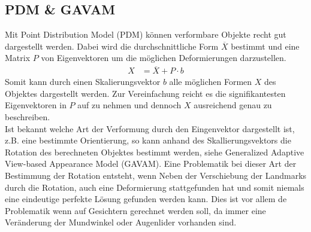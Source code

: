 \subsection{PDM \& GAVAM}
Mit Point Distribution Model (PDM) können verformbare Objekte recht gut dargestellt werden. Dabei wird die durchschnittliche Form $\overline{X}$ bestimmt und eine Matrix $P$ von Eigenvektoren um die möglichen Deformierungen darzustellen.
\begin{align*}
X &= \overline{X}+P\cdot b
\end{align*}
Somit kann durch einen Skalierungsvektor $b$ alle möglichen Formen $X$ des Objektes dargestellt werden. Zur Vereinfachung reicht es die signifikantesten Eigenvektoren in $P$ auf zu nehmen und dennoch $X$ ausreichend genau zu beschreiben.\\
Ist bekannt welche Art der Verformung durch den Eingenvektor dargestellt ist, z.B. eine bestimmte Orientierung, so kann anhand des Skallierungsvektors die Rotation des berechneten Objektes bestimmt werden, siehe Generalized Adaptive View-based Appearance Model (GAVAM). Eine Problematik bei dieser Art der Bestimmung der Rotation entsteht, wenn Neben der Verschiebung der Landmarks durch die Rotation, auch eine Deformierung stattgefunden hat und somit niemals eine eindeutige perfekte Lösung gefunden werden kann. Dies ist vor allem de Problematik wenn auf Gesichtern gerechnet werden soll, da immer eine Veränderung der Mundwinkel oder Augenlider vorhanden sind.\\
\cite{wiki_PDM}\cite{pdf_PDM}\cite{pdf_GAVAM}